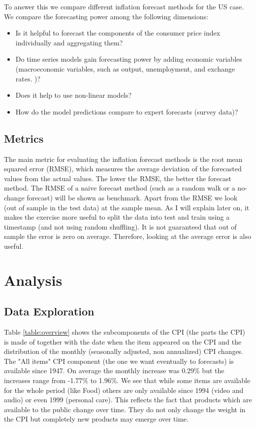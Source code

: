 \documentclass[12pt]{article}
\begin{document}
To answer this we compare different inflation forecast methods for the US case. We compare the forecasting power among the following dimensions: 
\begin{itemize}
\item Is it helpful to forecast the components of the consumer price index individually and aggregating them?
\item Do time series models gain forecasting power by adding economic variables (macroeconomic variables, such as output, unemployment, and exchange rates. )?
\item Does it help to use non-linear models?
\item How do the model predictions compare to expert forecasts (survey data)?
\end{itemize}

\subsection{Metrics}
The main metric for evaluating the inflation forecast methods is the root mean squared error (RMSE), which measures the average deviation of the forecasted values from the actual values. The lower the RMSE, the better the forecast method.
The RMSE of a naive forecast method (such as a random walk or a no-change forecast) will be shown as benchmark.
Apart from the RMSE we look (out of sample in the test data) at the sample mean. As I will explain later on, it makes the exercise more useful to split the data into test and train using a timestamp (and not using random shuffling). It is not guaranteed that out of sample the error is zero on average. Therefore, looking at the average error is also useful. 

\section{Analysis}
\subsection{Data Exploration}

Table \ref{table:overview} shows the subcomponents of the CPI (the parts the CPI) is made of together with the date when the item appeared on the CPI and the distribution of the monthly (seasonally adjusted, non annualized) CPI changes. 
The "All items" CPI component  (the one we want eventually to forecasts) is available since 1947. On average the monthly increase was 0.29\% but the increases range from -1.77\% to 1.96\%.
We see that while some items are available for the whole period (like Food) others are only available since 1994 (video and audio) or even 1999 (personal care). This reflects the fact that products which are available to the public change over time. They do not only change the weight in the CPI but completely new products may emerge over time. 
\end{document}
